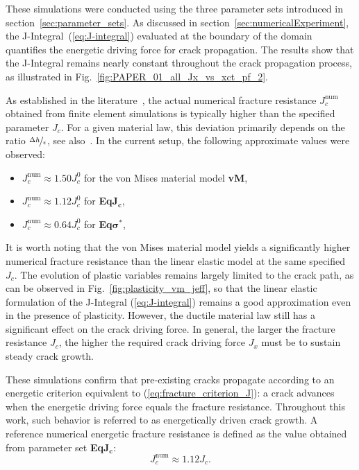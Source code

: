 \documentclass[pdflatex,sn-mathphys-num]{sn-jnl}%
\newcommand{\vMLabel}{\textbf{vM}\xspace}
\newcommand{\EqJcLabel}{\textbf{Eq$\boldsymbol{J_c}$}\xspace}
\newcommand{\EqSigmaStarLabel}{\textbf{Eq$\boldsymbol{\sigma^*}$}\xspace}
\theoremstyle{thmstyleone}%
\theoremstyle{thmstyletwo}%
\theoremstyle{thmstylethree}%
\begin{document}
These simulations were conducted using the three parameter sets introduced in section~\ref{sec:parameter_sets}. 
As discussed in section~\ref{sec:numericalExperiment}, the J-Integral~(\ref{eq:J-integral}) evaluated at the boundary of the domain quantifies the energetic driving force for crack propagation. 
The results show that the J-Integral remains nearly constant throughout the crack propagation process, as illustrated in Fig.~\ref{fig:PAPER_01_all_Jx_vs_xct_pf_2}.

As established in the literature~\cite{tanne_crack_2018}, the actual numerical fracture resistance $J_c^{\text{num}}$ obtained from finite element simulations is typically higher than the specified parameter $J_c$. For a given material law, this deviation primarily depends on the ratio $\nicefrac{\Delta{h}}{\epsilon}$, see also~\cite{tanne_crack_2018}. In the current setup, the following approximate values were observed:
\begin{itemize}
    \item $J_c^{\text{num}} \approx 1.50J_c^0$ for the von Mises material model \vMLabel,
    \item $J_c^{\text{num}} \approx 1.12J_c^0$ for \EqJcLabel,
    \item $J_c^{\text{num}} \approx 0.64J_c^0$ for \EqSigmaStarLabel,
\end{itemize}
It is worth noting that the von Mises material model yields a significantly higher numerical fracture resistance than the linear elastic model at the same specified $J_c$. The evolution of plastic variables remains largely limited to the crack path, as can be observed in Fig.~\ref{fig:plasticity_vm_jeff}, so that the linear elastic formulation of the J-Integral (\ref{eq:J-integral}) remains a good approximation even in the presence of plasticity. However, the ductile material law still has a significant effect on the crack driving force. In general, the larger the fracture resistance $J_c$, the higher the required crack driving force $J_x$ must be to sustain steady crack growth.

These simulations confirm that pre-existing cracks propagate according to an energetic criterion equivalent to \deleted{~}(\ref{eq:fracture_criterion_J}): a crack advances when the energetic driving force equals the fracture resistance. Throughout this work, such behavior is referred to as energetically driven crack growth. A reference numerical energetic fracture resistance is defined as the value obtained from parameter set \EqJcLabel:
\begin{equation}
    J_c^{\text{num}} \approx 1.12J_c.
\end{equation}
\end{document}
